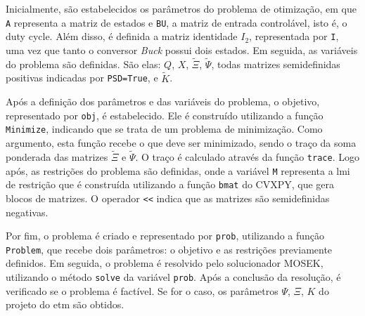 Inicialmente, são estabelecidos os parâmetros do problema de otimização, em que \texttt{A} representa a matriz de estados e \texttt{BU}, a matriz de entrada controlável, isto é, o duty cycle. Além disso, é definida a matriz identidade $I_2$, representada por \texttt{I}, uma vez que tanto o conversor \textit{Buck} possui dois estados. Em seguida, as variáveis do problema são definidas. São elas: $Q$, $X$, $\tilde{\Xi}$, $\tilde{\Psi}$, todas matrizes semidefinidas positivas indicadas por \texttt{PSD=True}, e $\tilde{K}$.

Após a definição dos parâmetros e das variáveis do problema, o objetivo, representado por \texttt{obj}, é estabelecido. Ele é construído utilizando a função \texttt{Minimize}, indicando que se trata de um problema de minimização. Como argumento, esta função recebe o que deve ser minimizado, sendo o traço da soma ponderada das matrizes $\tilde{\Xi}$ e $\tilde{\Psi}$. O traço é calculado através da função \texttt{trace}. Logo após, as restrições do problema são definidas, onde a variável \texttt{M} representa a \acrshort{lmi} de restrição que é construída utilizando a função \texttt{bmat} do CVXPY, que gera blocos de matrizes. O operador \texttt{<<} indica que as matrizes são semidefinidas negativas.

Por fim, o problema é criado e representado por \texttt{prob}, utilizando a função \texttt{Problem}, que recebe dois parâmetros: o objetivo e as restrições previamente definidos. Em seguida, o problema é resolvido pelo solucionador MOSEK, utilizando o método \texttt{solve} da variável \texttt{prob}. Após a conclusão da resolução, é verificado se o problema é factível. Se for o caso, os parâmetros $\Psi$, $\Xi$, $K$ do projeto do \acrshort{etm} são obtidos.